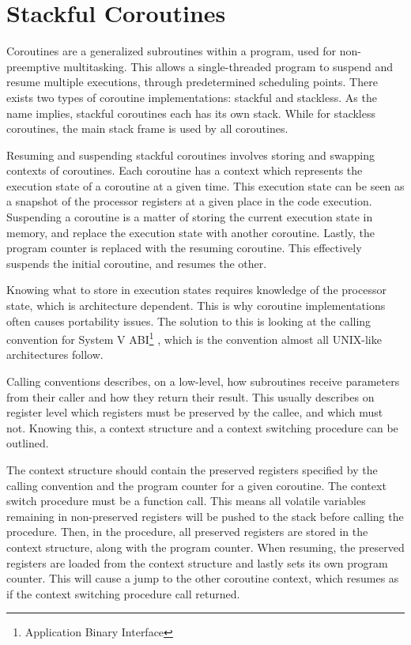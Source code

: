 \FloatBarrier

\section{Stackful Coroutines}
\label{sec:stackful_coroutines}

Coroutines are a generalized subroutines within a program, used for non-preemptive multitasking. This allows a single\hyp{}threaded program to suspend and resume multiple executions, through predetermined scheduling points. There exists two types of coroutine implementations: stackful and stackless. As the name implies, stackful coroutines each has its own stack. While for stackless coroutines, the main stack frame is used by all coroutines.

Resuming and suspending stackful coroutines involves storing and swapping contexts of coroutines. Each coroutine has a context which represents the execution state of a coroutine at a given time. This execution state can be seen as a snapshot of the processor registers at a given place in the code execution. Suspending a coroutine is a matter of storing the current execution state in memory, and replace the execution state with another coroutine. Lastly, the program counter is replaced with the resuming coroutine. This effectively suspends the initial coroutine, and resumes the other. 

Knowing what to store in execution states requires knowledge of the processor state, which is architecture dependent. This is why coroutine implementations often causes portability issues. The solution to this is looking at the calling convention for System V ABI\footnote{Application Binary Interface} \citep{systemvabi}, which is the convention almost all UNIX\hyp{}like architectures follow. 

Calling conventions describes, on a low\hyp{}level, how subroutines receive parameters from their caller and how they return their result. This usually describes on register level which registers must be preserved by the callee, and which must not. Knowing this, a context structure and a context switching procedure can be outlined. 

The context structure should contain the preserved registers specified by the calling convention and the program counter for a given coroutine. The context switch procedure must be a function call. This means all volatile variables remaining in non\hyp{}preserved registers will be pushed to the stack before calling the procedure. Then, in the procedure, all preserved registers are stored in the context structure, along with the program counter. When resuming, the preserved registers are loaded from the context structure and lastly sets its own program counter. This will cause a jump to the other coroutine context, which resumes as if the context switching procedure call returned. 

